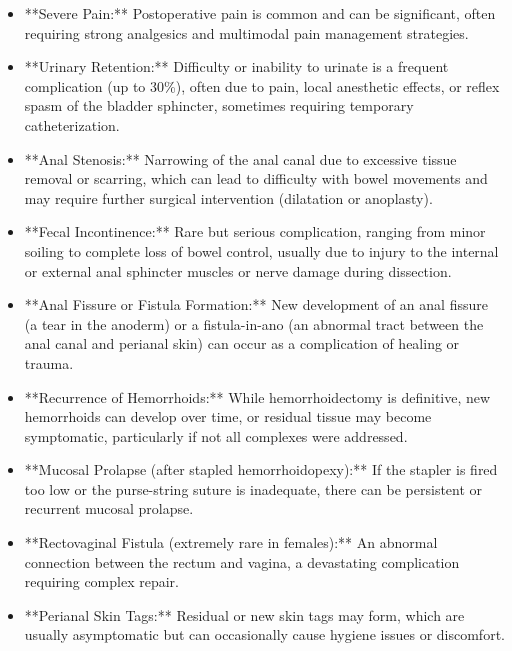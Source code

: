 \begin{itemize}
  \item **Severe Pain:** Postoperative pain is common and can be significant, often requiring strong analgesics and multimodal pain management strategies.
  
  \item **Urinary Retention:** Difficulty or inability to urinate is a frequent complication (up to 30\%), often due to pain, local anesthetic effects, or reflex spasm of the bladder sphincter, sometimes requiring temporary catheterization.
  
  \item **Anal Stenosis:** Narrowing of the anal canal due to excessive tissue removal or scarring, which can lead to difficulty with bowel movements and may require further surgical intervention (dilatation or anoplasty).
  
  \item **Fecal Incontinence:** Rare but serious complication, ranging from minor soiling to complete loss of bowel control, usually due to injury to the internal or external anal sphincter muscles or nerve damage during dissection.
  
  \item **Anal Fissure or Fistula Formation:** New development of an anal fissure (a tear in the anoderm) or a fistula-in-ano (an abnormal tract between the anal canal and perianal skin) can occur as a complication of healing or trauma.
  
  \item **Recurrence of Hemorrhoids:** While hemorrhoidectomy is definitive, new hemorrhoids can develop over time, or residual tissue may become symptomatic, particularly if not all complexes were addressed.
  
  \item **Mucosal Prolapse (after stapled hemorrhoidopexy):** If the stapler is fired too low or the purse-string suture is inadequate, there can be persistent or recurrent mucosal prolapse.
  
  \item **Rectovaginal Fistula (extremely rare in females):** An abnormal connection between the rectum and vagina, a devastating complication requiring complex repair.
  
  \item **Perianal Skin Tags:** Residual or new skin tags may form, which are usually asymptomatic but can occasionally cause hygiene issues or discomfort.
\end{itemize}

